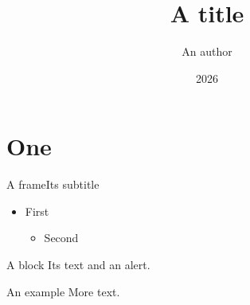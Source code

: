 \documentclass{beamer}
\title{A title}
\author{An author}
\institute{A place}
\date{2026}
\begin{document}
\begin{frame}
\titlepage
\end{frame}
\section{One}
\begin{frame}{A frame}{Its subtitle}
\begin{itemize}
\item First
\begin{itemize}
\item Second
\end{itemize}
\end{itemize}
\begin{block}{A block}
Its text and \alert{an alert}.
\end{block}
\begin{exampleblock}{An example}
More text.
\end{exampleblock}
\end{frame}
\end{document}
